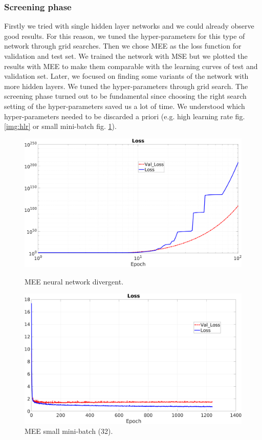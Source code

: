 \subsubsection{Screening phase}
Firstly we tried with single hidden layer networks and we could already observe good results. For this reason, we tuned the hyper-parameters for this type of network through grid searches.
Then we chose MEE as the loss function for validation and test set. We trained the network with MSE but we plotted the results with MEE to make them comparable with the learning curves of test and validation set.
Later, we focused on finding some variants of the network with more hidden layers. We tuned the hyper-parameters through grid search.
The screening phase turned out to be fundamental since choosing the right search setting of the hyper-parameters saved us a lot of time. We understood  which hyper-parameters needed to be discarded a priori (e.g. high learning rate fig.\ref{img:hlr} or small mini-batch fig. \ref{img:smb}).

\begin{figure}[H]
	\centering
	\begin{minipage}[t]{0.5\linewidth}
		\includegraphics[width=\linewidth]{img/Cup_loss_divergente.png}
		\caption{MEE neural network divergent.}
		\label{img:hlr}
	\end{minipage}%
	\begin{minipage}[t]{0.5\linewidth}
		\includegraphics[width=\linewidth]{img/Cup_loss_noSmooth.png}
		\caption{MEE small mini-batch (32).}
		\label{img:smb}
	\end{minipage}
\end{figure}

